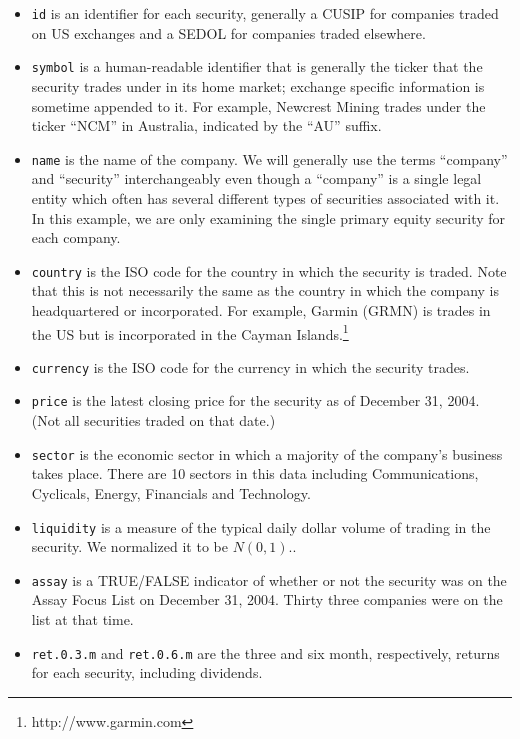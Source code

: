 \documentclass{article}
\begin{document}
\begin{itemize}
  
\item \texttt{id} is an identifier for each security, generally a
  CUSIP for companies traded on US exchanges and a SEDOL for companies
  traded elsewhere.

\item \texttt{symbol} is a human-readable identifier that is generally
  the ticker that the security trades under in its home market;
  exchange specific information is sometime appended to it. For
  example, Newcrest Mining trades under the ticker ``NCM'' in
  Australia, indicated by the ``AU'' suffix.
  
\item \texttt{name} is the name of the company. We will generally use
  the terms ``company'' and ``security'' interchangeably even though a
  ``company'' is a single legal entity which often has several
  different types of securities associated with it. In this example,
  we are only examining the single primary equity security for each
  company.
  
\item \texttt{country} is the ISO code for the country in which the
  security is traded. Note that this is not necessarily the same as
  the country in which the company is headquartered or incorporated.
  For example, Garmin (GRMN) is trades in the US but is incorporated
  in the Cayman Islands.\footnote{http://www.garmin.com}
  
\item \texttt{currency} is the ISO code for the currency in which the
  security trades.
  
\item \texttt{price} is the latest closing price for the security as
  of December 31, 2004. (Not all securities traded on that date.)
  
\item \texttt{sector} is the economic sector in which a majority of
  the company's business takes place. There are
  10 sectors in this data including
  Communications, Cyclicals, Energy, Financials and Technology.
  
\item \texttt{liquidity} is a measure of the typical daily dollar
  volume of trading in the security. We normalized it to be $N(0,1)$..
  
\item \texttt{assay} is a TRUE/FALSE indicator of whether or not the
  security was on the Assay Focus List on December 31, 2004. Thirty
  three companies were on the list at that time.
  
\item \texttt{ret.0.3.m} and \texttt{ret.0.6.m} are the three and six
  month, respectively, returns for each security, including dividends.

\end{itemize}
\end{document}
